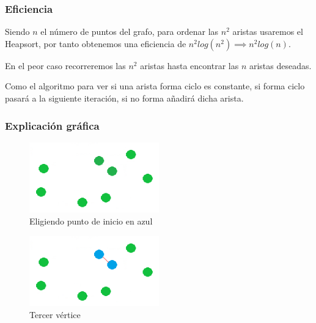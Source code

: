 
\subsubsection{Eficiencia}
\begin{frame}
	\begin{block}{ }
	Siendo $n$ el número de puntos del grafo, para ordenar las $n^2$ aristas usaremos el 	
	Heapsort, por tanto obtenemos una eficiencia de $n^2log(n^2) \implies n^2log(n)$.
	\end{block}
	
	\begin{block}{ }
	En el peor caso recorreremos las $n^2$ aristas hasta encontrar las $n$ aristas  	
	deseadas.

	Como el algoritmo para ver si una arista forma ciclo es constante, si forma ciclo 
	pasará a la siguiente iteración, si no forma añadirá dicha arista.
	\end{block}
\end{frame}

\subsubsection{Explicación gráfica}

\begin{frame}
	\begin{exampleblock}{ }
	\begin{figure}[htbH] 
		\centering
		\includegraphics[width=0.5\textwidth]{./Imagenes/arista1.png}
		\caption{Eligiendo punto de inicio en azul} 
	\end{figure}
	\end{exampleblock}
\end{frame}

\begin{frame}
	\begin{exampleblock}{ }
	\begin{figure}[htbH] 
		\centering
		\includegraphics[width=0.5\textwidth]{./Imagenes/arista2.png}
		\caption{Tercer vértice} 
	\end{figure}
	\end{exampleblock}
\end{frame}

